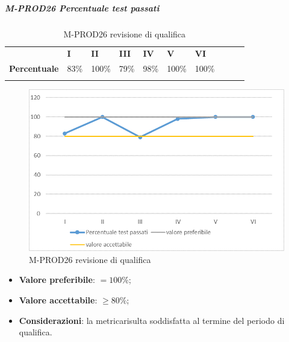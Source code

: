\subparagraph{M-PROD26 Percentuale test passati} \mbox{}
\begin{longtable}[H!] {						
		>{}p{50mm}  		
		>{}p{8mm}
		>{}p{8mm}		
		>{}p{8mm}		
		>{}p{8mm}		
		>{}p{8mm}		
		>{}p{8mm}
		>{}p{8mm}
		>{}p{8mm}
		>{}p{8mm}
	}
	\rowcolor{gray!50}
	\textbf{} & \textbf{I} & \textbf{II} & \textbf{III} & \textbf{IV} & \textbf{V} & \textbf{VI} \TBstrut \\ [2mm]
	\textbf{Percentuale} & 83\% & 100\% & 79\% & 98\% & 100\% & 100\% \TBstrut \\ [2mm]
	\rowcolor{white}
	\caption{M-PROD26 revisione di qualifica}
\end{longtable}
\begin{figure}[H] 	
	\includegraphics[width=\linewidth]{./img/grafici/RQ26.png}	
	\caption{M-PROD26 revisione di qualifica}	
\end{figure}
\begin{itemize}
	\item \textbf{Valore preferibile}: $= 100\%$;
	\item \textbf{Valore accettabile}: $\ge 80\%$;
	\item \textbf{Considerazioni}: la metrica\glosp risulta soddisfatta al termine del periodo di qualifica.
\end{itemize}











